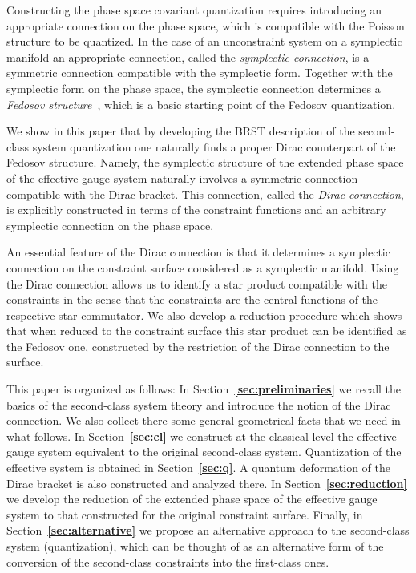 \documentclass[a4paper,11pt]{amsart}
\numberwithin{thm}{section} %
\numberwithin{equation}{section} %
\numberwithin{figure}{section} %
\newcommand{\bref}[1]{{\bf \ref{#1}}}
\renewcommand{\:}{{\rm\, :\,}}
\begin{document}

Constructing the phase space covariant quantization requires
introducing an appropriate connection on the phase space, which is
compatible with the Poisson structure to be quantized.  In the
case of an unconstraint system on a symplectic manifold
an appropriate connection, called the \textit{symplectic connection},
is a symmetric connection compatible with the symplectic form.
Together with the symplectic form on the phase space, the symplectic
connection determines a \textit{Fedosov structure}~\cite{[GRS]},
which is a basic starting point of the Fedosov quantization.


We show in this paper that by developing the BRST description of the
second-class system quantization one naturally finds a proper
Dirac counterpart of the Fedosov structure.  Namely, the symplectic
structure of the extended phase space of the effective gauge system
naturally involves a symmetric connection compatible with the Dirac
bracket.  This connection, called the \textit{Dirac connection},
is explicitly constructed in terms of the constraint functions
and an arbitrary symplectic connection on the phase space.


An essential feature of the Dirac connection is that
it determines a symplectic connection on the constraint
surface considered as a symplectic manifold.
Using the Dirac connection allows us to identify a star product
compatible with the constraints in the sense that the constraints are
the central functions of the respective star commutator.
We also develop a reduction procedure which shows
that when reduced to the constraint surface this star product
can be identified as the Fedosov one, constructed by the restriction
of the Dirac connection to the surface.



This paper is organized as follows: In Section~\bref{sec:preliminaries}
we recall the basics of the second-class system theory and introduce
the notion of the Dirac connection. We also collect there some general
geometrical facts that we need in what follows. In
Section~\bref{sec:cl} we construct at the
classical level the effective gauge system
equivalent to the original second-class system.
Quantization of the effective system is obtained
in Section~\bref{sec:q}. A quantum deformation of
the Dirac bracket is also constructed and analyzed there.
In Section~\bref{sec:reduction} we develop
the reduction of the extended phase space of the effective gauge
system to that constructed for the original constraint surface.
Finally, in Section~\bref{sec:alternative} we propose an alternative
approach to the second-class system (quantization), which can be
thought of as an alternative form of the conversion of the second-class
constraints into the first-class ones.
\end{document}

